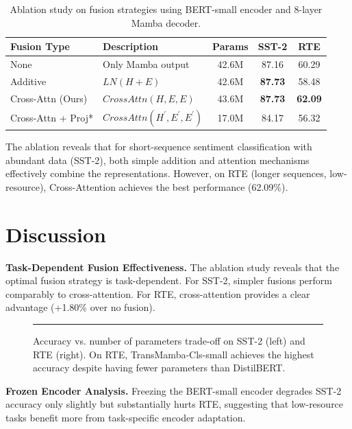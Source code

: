 \documentclass[10pt, conference]{IEEEtran}
\begin{document}
\begin{table}[htbp]
\caption{Ablation study on fusion strategies using BERT-small encoder and 8-layer Mamba decoder.} %
\label{tab:ablation}
\centering
\begin{tabular}{llccc}
\toprule
\textbf{Fusion Type} & \textbf{Description} & \textbf{Params} & \textbf{SST-2} & \textbf{RTE} \\ %
\midrule
None & Only Mamba output & 42.6M & 87.16 & 60.29 \\ %
Additive & $LN(H+E)$ & 42.6M & \textbf{87.73} & 58.48 \\ %
Cross-Attn (Ours) & $CrossAttn(H,E,E)$ & 43.6M & \textbf{87.73} & \textbf{62.09} \\ %
Cross-Attn + Proj* & $CrossAttn(H^{\prime}, E^{\prime}, E^{\prime})$ & 17.0M & 84.17 & 56.32 \\ %
\bottomrule
\end{tabular}
\end{table}

The ablation reveals that for short-sequence sentiment classification with abundant data (SST-2), both simple addition and attention mechanisms effectively combine the representations. %
However, on RTE (longer sequences, low-resource), Cross-Attention achieves the best performance (62.09\%). %

\section{Discussion} %
\textbf{Task-Dependent Fusion Effectiveness.} The ablation study reveals that the optimal fusion strategy is task-dependent. %
For SST-2, simpler fusions perform comparably to cross-attention. %
For RTE, cross-attention provides a clear advantage (+1.80\% over no fusion). %

\begin{figure}[htbp]
\centering
\rule{8cm}{4cm} %
\caption{Accuracy vs. number of parameters trade-off on SST-2 (left) and RTE (right). On RTE, TransMamba-Cls-small achieves the highest accuracy despite having fewer parameters than DistilBERT.} %
\label{fig:scatter}
\end{figure}

\textbf{Frozen Encoder Analysis.} Freezing the BERT-small encoder degrades SST-2 accuracy only slightly but substantially hurts RTE, suggesting that low-resource tasks benefit more from task-specific encoder adaptation. %
\end{document}
